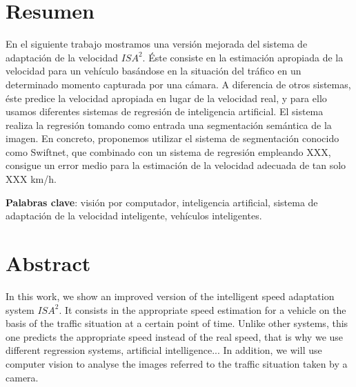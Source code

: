 \chapter{Resumen}


En el siguiente trabajo mostramos una versión mejorada del sistema de adaptación de la velocidad $ISA^{2}$. Éste consiste en la estimación apropiada de la velocidad para un vehículo basándose en la situación del tráfico en un determinado momento capturada por una cámara. A diferencia de otros sistemas, éste predice la velocidad apropiada en lugar de la velocidad real, y para ello usamos diferentes sistemas de regresión de inteligencia artificial. El sistema realiza la regresión tomando como entrada una segmentación semántica de la imagen. En concreto, proponemos utilizar el sistema de segmentación conocido como Swiftnet, que combinado con un sistema de regresión empleando XXX, consigue un error medio para la estimación de la velocidad adecuada de tan solo XXX km/h.


\vspace{0.5cm}

\textbf{Palabras clave}: visión por computador, inteligencia artificial, sistema de adaptación de la velocidad inteligente, vehículos inteligentes.

\newpage
\thispagestyle{empty}
\hspace*{0.5cm}
\newpage

\chapter{Abstract}
In this work, we show an improved version of the intelligent speed adaptation system  $ISA^{2}$. It consists in the appropriate speed estimation for a vehicle on the basis of the traffic situation at a certain point of time. Unlike other systems, this one predicts the appropriate speed instead of the real speed, that is why we use different regression systems, artificial intelligence... In addition, we will use computer vision to analyse the images referred to the traffic situation taken by a camera.

